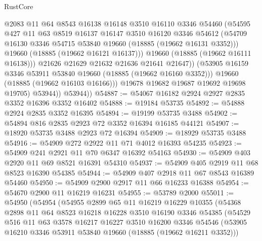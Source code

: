 \begin{lexlean}{RustCore}
\begin{coremodule}
                      @2083
                      @11
                      @64
                      @8543
                      @16138
                      @16148
                      @3510
                      @16110
                      @3346
                      @54460
                      (@54595
                        @427
                        @11
                        @63
                        @8519
                        @16137
                        @16147
                        @3510
                        @16120
                        @3346
                        @54612
                        (@54709 @16130 @3346 @54715 @53840 @19660 (@18885 (@19662 @16131 @3352)))
                        @19660
                        (@18885 (@19662 @16121 @16137)))
                      @19660
                      (@18885 (@19662 @16111 @16138)))
                    @21626
                    @21629
                    @21632
                    @21636
                    @21641
                    @21647))
                (@53905 @16159 @3346 @53911 @53840 @19660 (@18885 (@19662 @16160 @3352)))
                @19660
                (@18885 (@19662 @16103 @16166)))
              @19678
              @19682
              @19687
              @19692
              @19698
              @19705)
            @53944))
        @53944))
@54887 := @54067 @16182 @2924 @2927 @2835 @3352 @16396 @3352 @16402
@54888 := @19184 @53735
@54892 := @54888 @2924 @2835 @3352 @16395
@54894 := @19199 @53735 @3488
@54902 := @54894 @816 @2835 @2923 @72 @3352 @16394 @16185 @44121
@54907 := @18920 @53735 @3488 @2923 @72 @16394
@54909 := @18929 @53735 @3488
@54916 := @54909 @272 @2922 @11 @71 @4012 @16393 @54235
@54923 := @54909 @241 @2921 @11 @70 @6347 @16392 @54163
@54930 := @54909 @403 @2920 @11 @69 @8521 @16391 @54310
@54937 := @54909 @405 @2919 @11 @68 @8523 @16390 @54385
@54944 := @54909 @407 @2918 @11 @67 @8543 @16389 @54460
@54950 := @54909 @2900 @2917 @11 @66 @16233 @16388
@54954 := @54670 @2900 @11 @16219 @16231
@54955 := @53789 @2000
@55011 := @54950
    (@54954
      (@54955
        @2899
        @65
        @11
        @16219
        @16229
        @10355
        (@54368
          @2898
          @11
          @64
          @8523
          @16218
          @16228
          @3510
          @16190
          @3346
          @54385
          (@54529
            @516
            @11
            @63
            @3578
            @16217
            @16227
            @3510
            @16200
            @3346
            @54546
            (@53905 @16210 @3346 @53911 @53840 @19660 (@18885 (@19662 @16211 @3352)))

\end{coremodule}
\end{lexlean}
